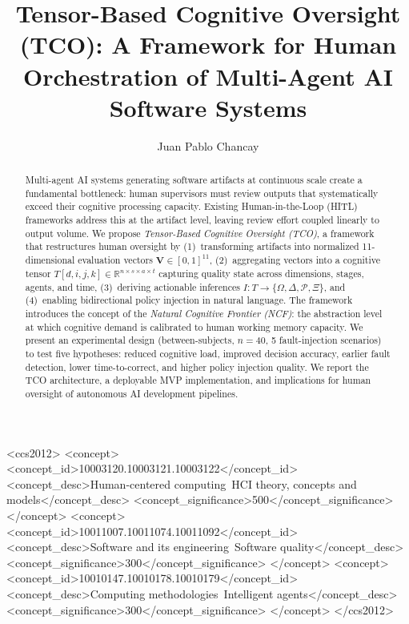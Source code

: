 \documentclass[manuscript,review,anonymous]{acmart}
\begin{document}
\title{Tensor-Based Cognitive Oversight (TCO): A Framework for Human Orchestration of Multi-Agent AI Software Systems}

\author{Juan Pablo Chancay}
\email{[email]}

\begin{abstract}
Multi-agent AI systems generating software artifacts at continuous scale create a
fundamental bottleneck: human supervisors must review outputs that systematically
exceed their cognitive processing capacity. Existing Human-in-the-Loop (HITL)
frameworks address this at the artifact level, leaving review effort coupled linearly
to output volume. We propose \textit{Tensor-Based Cognitive Oversight (TCO)}, a
framework that restructures human oversight by (1)~transforming artifacts into
normalized 11-dimensional evaluation vectors \(\mathbf{V} \in [0,1]^{11}\), (2)~aggregating
vectors into a cognitive tensor \(T[d, i, j, k] \in \mathbb{R}^{n \times s \times a \times t}\)
capturing quality state across dimensions, stages, agents, and time, (3)~deriving
actionable inferences \(I: T \rightarrow \{\Omega, \Delta, \mathcal{P}, \Xi\}\), and
(4)~enabling bidirectional policy injection in natural language. The framework introduces
the concept of the \textit{Natural Cognitive Frontier (NCF)}: the abstraction level at
which cognitive demand is calibrated to human working memory capacity. We present an
experimental design (between-subjects, $n = 40$, 5 fault-injection scenarios) to test
five hypotheses: reduced cognitive load, improved decision accuracy, earlier fault
detection, lower time-to-correct, and higher policy injection quality. We report
the TCO architecture, a deployable MVP implementation, and implications for human
oversight of autonomous AI development pipelines.
\end{abstract}


\begin{CCSXML}
<ccs2012>
   <concept>
       <concept_id>10003120.10003121.10003122</concept_id>
       <concept_desc>Human-centered computing~HCI theory, concepts and models</concept_desc>
       <concept_significance>500</concept_significance>
   </concept>
   <concept>
       <concept_id>10011007.10011074.10011092</concept_id>
       <concept_desc>Software and its engineering~Software quality</concept_desc>
       <concept_significance>300</concept_significance>
   </concept>
   <concept>
       <concept_id>10010147.10010178.10010179</concept_id>
       <concept_desc>Computing methodologies~Intelligent agents</concept_desc>
       <concept_significance>300</concept_significance>
   </concept>
</ccs2012>
\end{CCSXML}
\end{document}
